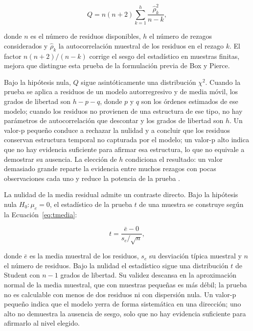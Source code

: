 \documentclass[12pt,letterpaper]{article}
\providecommand{\parencite}{\citep}
\begin{document}
\begin{equation}
Q=n(n+2)\sum_{k=1}^{h}\frac{\hat{\rho}_k^{2}}{n-k},
\label{eq:ljungbox}
\end{equation}

donde $n$ es el número de residuos disponibles, $h$ el número de rezagos considerados y $\hat{\rho}_k$ la autocorrelación muestral de los residuos en el rezago $k$. El factor $n(n+2)/(n-k)$ corrige el sesgo del estadístico en muestras finitas, mejora que distingue esta prueba de la formulación previa de Box y Pierce.

Bajo la hipótesis nula, $Q$ sigue asintóticamente una distribución $\chi^2$. Cuando la prueba se aplica a residuos de un modelo autorregresivo y de media móvil, los grados de libertad son $h-p-q$, donde $p$ y $q$ son los órdenes estimados de ese modelo; cuando los residuos no provienen de una estructura de ese tipo, no hay parámetros de autocorrelación que descontar y los grados de libertad son $h$. Un valor-p pequeño conduce a rechazar la nulidad y a concluir que los residuos conservan estructura temporal no capturada por el modelo; un valor-p alto indica que no hay evidencia suficiente para afirmar esa estructura, lo que no equivale a demostrar su ausencia. La elección de $h$ condiciona el resultado: un valor demasiado grande reparte la evidencia entre muchos rezagos con pocas observaciones cada uno y reduce la potencia de la prueba \parencite{hyndman2021fpp3}.

La nulidad de la media residual admite un contraste directo. Bajo la hipótesis nula \(H_0:\mu_e=0\), el estadístico de la prueba \(t\) de una muestra se construye según la Ecuación~\ref{eq:tmedia}:

\begin{equation}
t=\frac{\bar{e}-0}{s_e/\sqrt{n}},
\label{eq:tmedia}
\end{equation}

donde \(\bar{e}\) es la media muestral de los residuos, \(s_e\) su desviación típica muestral y \(n\) el número de residuos. Bajo la nulidad el estadístico sigue una distribución \(t\) de Student con \(n-1\) grados de libertad. Su validez descansa en la aproximación normal de la media muestral, que con muestras pequeñas es más débil; la prueba no es calculable con menos de dos residuos ni con dispersión nula. Un valor-p pequeño indica que el modelo yerra de forma sistemática en una dirección; uno alto no demuestra la ausencia de sesgo, solo que no hay evidencia suficiente para afirmarlo al nivel elegido.
\end{document}
